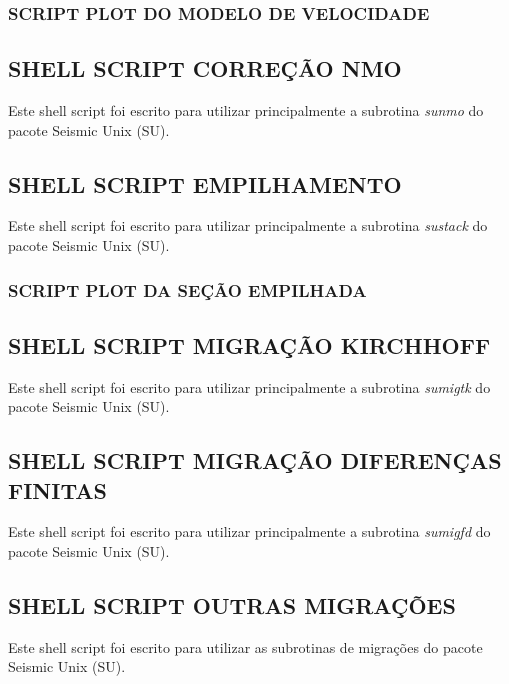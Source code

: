 \subsubsection*{SCRIPT PLOT DO MODELO DE VELOCIDADE}


\newpage
\subsection{SHELL SCRIPT CORREÇÃO NMO}
\label{apendice_M}
Este shell script foi escrito para utilizar principalmente a subrotina \textit{sunmo} do pacote Seismic Unix (SU).



\newpage
\subsection{SHELL SCRIPT EMPILHAMENTO}
\label{apendice_N}
Este shell script foi escrito para utilizar principalmente a subrotina \textit{sustack} do pacote Seismic Unix (SU).


\subsubsection*{SCRIPT PLOT DA SEÇÃO EMPILHADA}


\newpage
\subsection{SHELL SCRIPT MIGRAÇÃO KIRCHHOFF}
\label{apendice_O}
Este shell script foi escrito para utilizar principalmente a subrotina \textit{sumigtk} do pacote Seismic Unix (SU).



\newpage
\subsection{SHELL SCRIPT MIGRAÇÃO DIFERENÇAS FINITAS}
\label{apendice_P}
Este shell script foi escrito para utilizar principalmente a subrotina \textit{sumigfd} do pacote Seismic Unix (SU).




\newpage
\subsection{SHELL SCRIPT OUTRAS MIGRAÇÕES}
\label{apendice_Q}
Este shell script foi escrito para utilizar as subrotinas de migrações do pacote Seismic Unix (SU).


